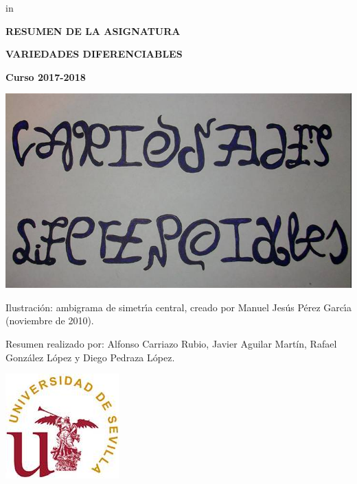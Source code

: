 \documentclass[twoside]{report}
\begin{document}
 in

\thispagestyle{empty}

\begin{center}
{\Large \bf RESUMEN DE LA ASIGNATURA}
\end{center}
\begin{center}
{\LARGE \bf VARIEDADES DIFERENCIABLES}
\end{center}
\begin{center}
{\Large \bf Curso 2017-2018}
\end{center}

\author{Alfonso Carriazo Rubio\\ Javier Aguilar Martín\\ Rafael González López\\ Diego Pedraza López}
	
\vspace{1.5cm}

\begin{center}
\includegraphics{ambigrama_big.jpg}
\end{center}

\noindent Ilustraci\'on: ambigrama de simetr\'{\i}a central,
creado por Manuel Jes\'us P\'erez Garc\'{\i}a (noviembre de 2010).

\noindent Resumen realizado por: Alfonso Carriazo Rubio, Javier Aguilar Martín, Rafael González López y Diego Pedraza López.

\vspace{1.5cm}

\begin{center}
\includegraphics{sellous4.jpg}
\end{center}
\end{document}
